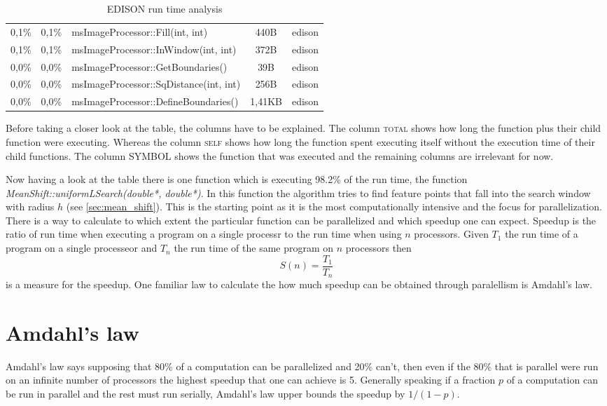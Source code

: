 \begin{table}[ht]
\begin{tabularx}{\textwidth}{cclcc}
	0,1\% & 	0,1\% & 	msImageProcessor::Fill(int, int) & 				440B & 	edison \\
	0,1\% & 	0,1\% & 	msImageProcessor::InWindow(int, int) & 			372B &	edison \\
	0,0\% & 	0,0\% &	msImageProcessor::GetBoundaries() &				39B & 	edison \\
	0,0\% & 	0,0\% & 	msImageProcessor::SqDistance(int, int) & 			256B & 	edison \\ 
	0,0\% & 	0,0\% & 	msImageProcessor::DefineBoundaries() &			1,41KB & edison \\ 
    \bottomrule
  \end{tabularx}
  \caption[EDISON run time profile]{ \gls{EDISON} run time analysis}
  \label{tab:comp}
\end{table}

Before taking a closer look at the table, the columns have to be explained. The
column {\textsc{total}} shows how long the function plus their child function
were executing. Whereas the column {\textsc{self}} shows how long the function spent
executing itself without the execution time of their child functions. The
column {\textsc{SYMBOL}} shows the function that was executed and the remaining
columns are irrelevant for now.

Now having a look at the table there is one function which is executing 98.2\%
of the run time, the function \emph{MeanShift::uniformLSearch(double*,
double*)}. In this function the algorithm tries to find feature points that fall
into the search window with radius $h$ (see \autoref{sec:mean_shift}). This is
the starting point as it is the most computationally intensive and the focus for
parallelization. There is a way to calculate to which extent the particular
function can be parallelized and which speedup one can expect. Speedup is the 
ratio of run time when executing a program on a single processr to the run time
when using $n$ processors. Given $T_1$ the run time of a program on a single
processeor and $T_n$ the run time of the same program on $n$ processors then
\begin{equation}\label{eq:speedup}
	S(n) = \frac{T_1}{T_n}
\end{equation}
is a measure for the speedup. One familiar law to calculate the how much speedup
can be obtained through paralellism is Amdahl's law. 

\section{Amdahl's law} 
\label{sec:amdahl_s_law}
Amdahl's law says supposing that 80\% of a computation can be parallelized and
20\% can't, then even if the 80\% that is parallel were run on an infinite
number of processors the highest speedup that one can achieve is 5. Generally
speaking if a fraction $p$ of a computation can be run in parallel and the rest
must run serially, Amdahl's law upper bounds the speedup by $1/(1-p)$.


